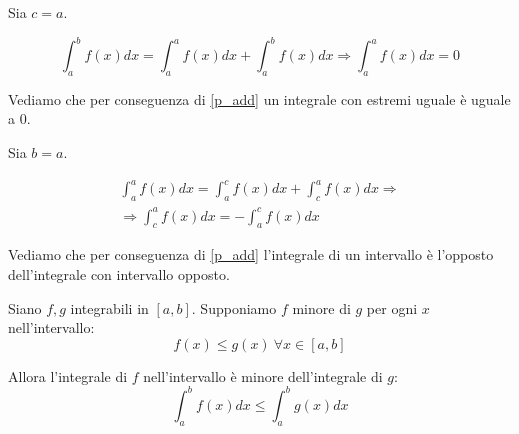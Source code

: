\begin{osservazione}
    Sia $c=a$.

    \begin{equation}
        \int_{a}^{b} f(x) dx = \int_{a}^{a} f(x) dx + \int_{a}^{b} f(x) dx \Rightarrow \int_{a}^{a} f(x) dx = 0
    \end{equation}

    Vediamo che per conseguenza di \ref{p_add} un integrale con estremi uguale è uguale a 0.
\end{osservazione}

\begin{osservazione}
    Sia $b=a$.

    \begin{gather}
        \int_{a}^{a} f(x) dx = \int_{a}^{c} f(x) dx + \int_{c}^{a} f(x) dx \Rightarrow \\ 
        \Rightarrow \int_{c}^{a} f(x) dx = - \int_{a}^{c} f(x) dx
    \end{gather}

    Vediamo che per conseguenza di \ref{p_add} l'integrale di un intervallo è l'opposto dell'integrale con intervallo opposto.
\end{osservazione}

\begin{proprieta}
    Siano $f,g$ integrabili in $[a,b]$. Supponiamo $f$ minore di $g$ per ogni $x$ nell'intervallo:
    \begin{equation}
        f (x)\leq g(x)\ \forall x\in[a,b]
    \end{equation}

    Allora l'integrale di $f$ nell'intervallo è minore dell'integrale di $g$:
    \begin{equation}
        \int_{a}^{b} f(x) dx \leq \int_{a}^{b} g(x) dx
    \end{equation}
\end{proprieta}

